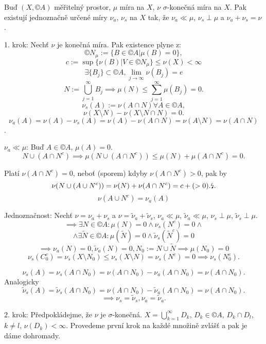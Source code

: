\documentclass[12pt]{article}					%
\begin{document}
\begin{veta}
	Buď $(X, ©A)$ měřitelný prostor, $\mu$ míra na $X$, $\nu$ $\sigma$-konečná míra na $X$. Pak existují jednoznačně určené míry $\nu_a$, $\nu_s$ na $X$ tak, že $\nu_a \ll \mu$, $\nu_s \perp \mu$ a $\nu_a + \nu_s = \nu$.

	\begin{dukazin}
		1. krok: Nechť $\nu$ je konečná míra. Pak existence plyne z:
		$$ ©N_\mu := \{B \in ©A | \mu(B) = 0\}, $$
		$$ c := \sup\{\nu(B) | V \in ©N_\mu\} ≤ \nu(X) < ∞ $$
		$$ \exists \{B_j\} \subset ©A, \lim_{j \rightarrow ∞} \nu(B_j) = e $$
		$$ N := \bigcup_{j=1}^∞ B_j \implies \mu(N) ≤ \sum_{j=1}^∞ \mu(B_j) = 0. $$
		$$ \nu_s(A) := \nu(A \cap N) \forall A \in ©A, $$
		$$ \nu(X \setminus N) - \nu(X \setminus N \cap N) = 0. $$
		$$ \nu_a(A) = \nu(A) - \nu_s(A) = \nu(A) - \nu(A \cap N) = \nu(A \setminus N) = \nu(A \cap N) $$.

		$\nu_a \ll \mu$: Buď $A \in ©A$, $\mu(A) = 0$.
		$$ N \cup (A \cap N^c) \implies \mu(N \cup (A \cap N^c)) ≤ \mu(N) + \mu(A \cap N^c) = 0. $$

		Platí $\nu(A \cap N^c) = 0$, neboť (sporem) kdyby $\nu(A \cap N^c) > 0$, pak by
		$$ \nu(N \cup (A \cup N^c)) = \nu(N) + \nu(A \cap N^c) = c + (>0). \text{\lightning}. $$
		$$ \nu(A \cup N^c) = \nu_a(A) $$

		Jednoznačnost: Nechť $\nu = \nu_a + \nu_s$ a $\nu = \tilde \nu_a + \tilde \nu_s$, $\nu_a \ll \mu$, $\tilde \nu_a \ll \mu$, $\nu_s \perp \mu$, $\tilde \nu_s \perp \mu$.
		$$  \implies \exists N \in ©A: \mu(N) = 0 \land \nu_s(N^c) = 0 \land $$
		$$ \land \exists \tilde N \in ©A: \mu(\tilde N) = 0 \land \tilde\nu_s(\tilde N^c) = 0 $$
		$$ \implies \nu_a(N) = 0, \tilde \nu_a(N) = 0, N_0 := N \cup \tilde N \implies \mu(N_0) = 0 $$
		$$ \nu_s(C_0^c) = \nu_s(X \setminus N_0) ≤ \nu_s(X \setminus N) = \nu_s(N^c) = 0 \implies \nu_s(N_0^c). $$

		$$ \nu_s(A) = \nu_s(A \cap N_0) = \nu(A \cap N_0) - \nu_a(A \cap N_0) = \nu(A \cap N_0). $$
		Analogicky
		$$ \tilde \nu_s(A) = \tilde \nu_s(A \cap N_0) = \nu(A \cap N_0) - \tilde \nu_a(A \cap N_0) = \nu(A \cap N_0). $$
		$$ \implies \nu_s = \tilde \nu_s, \nu_a = \tilde \nu_a. $$

		2. krok: Předpokládejme, že $\nu$ je $\sigma$-konečná. $X = \bigcup_{k=1}^∞ D_k$, $D_k \in ©A$, $D_k \cap D_l$, $k ≠ l$, $\nu(D_k) < ∞$. Provedeme první krok na každé množině zvlášť a pak je dáme dohromady.
	\end{dukazin}
\end{veta}
\end{document}
